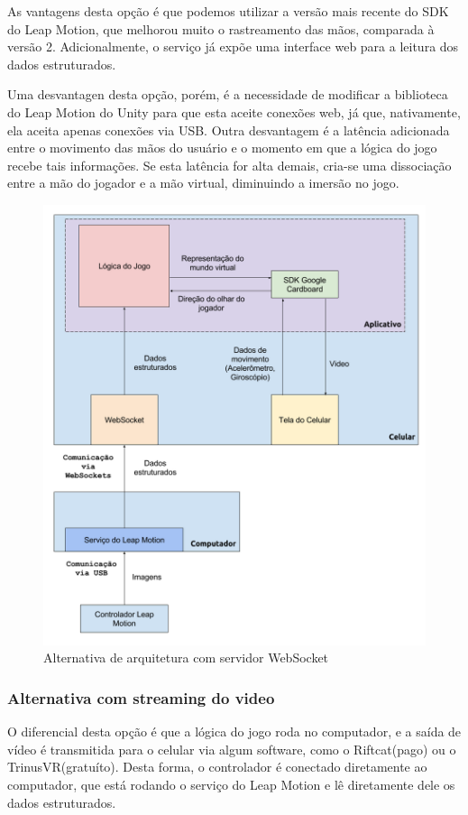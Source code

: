As vantagens desta opção é que podemos utilizar a versão mais recente do SDK do Leap Motion, que melhorou muito o rastreamento das mãos, comparada à versão 2. Adicionalmente, o serviço já expõe uma interface web para a leitura dos dados estruturados. 

Uma desvantagen desta opção, porém, é a necessidade de modificar a biblioteca do Leap Motion do Unity para que esta aceite conexões web, já que, nativamente, ela aceita apenas conexões via USB. Outra desvantagem é a latência adicionada entre o movimento das mãos do usuário e o momento em que a lógica do jogo recebe tais informações. Se esta latência for alta demais, cria-se uma dissociação entre a mão do jogador e a mão virtual, diminuindo a imersão no jogo.

\begin{figure}
	\centering
	\includegraphics[width=0.7\linewidth]{images/Arquitetura-leap-pc-leapdata-android}
	\caption{Alternativa de arquitetura com servidor WebSocket}
	\label{fig:arquitetura-leap-pc-leapdata-android}
\end{figure}

\subsubsection{Alternativa com streaming do video}\label{subsubsec-arquiteturas-leapmotion-pc-riftcat-android}

O diferencial desta opção é que a lógica do jogo roda no computador, e a saída de vídeo é transmitida para o celular via algum software, como o Riftcat(pago) ou o TrinusVR(gratuíto). Desta forma, o controlador é conectado diretamente ao computador, que está rodando o serviço do Leap Motion e lê diretamente dele os dados estruturados.

